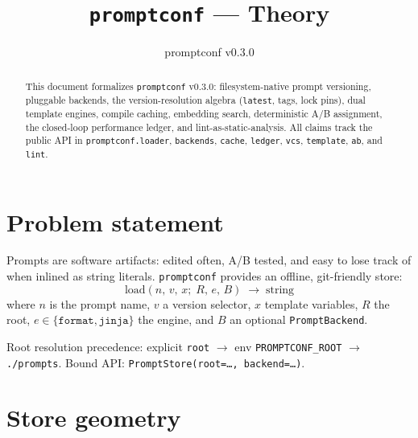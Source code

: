 \documentclass[11pt,a4paper]{article}
\newcommand{\pc}{\texttt{promptconf}}
\newcommand{\code}[1]{\texttt{#1}}
\begin{document}
\title{\pc{} --- Theory}
\author{promptconf v0.3.0}
\date{}
\maketitle

\begin{abstract}
This document formalizes \pc{} v0.3.0: filesystem-native prompt versioning,
pluggable backends, the version-resolution algebra (\code{latest}, tags, lock
pins), dual template engines, compile caching, embedding search, deterministic
A/B assignment, the closed-loop performance ledger, and lint-as-static-analysis.
All claims track the public API in \code{promptconf.loader}, \code{backends},
\code{cache}, \code{ledger}, \code{vcs}, \code{template}, \code{ab}, and
\code{lint}.
\end{abstract}

\tableofcontents
\newpage

\section{Problem statement}

Prompts are software artifacts: edited often, A/B tested, and easy to lose
track of when inlined as string literals. \pc{} provides an offline,
git-friendly store:
\begin{equation}
  \mathrm{load}(n,\, v,\, x;\; R,\, e,\, B) \;\longrightarrow\; \text{string}
\end{equation}
where $n$ is the prompt name, $v$ a version selector, $x$ template variables,
$R$ the root, $e \in \{\texttt{format},\texttt{jinja}\}$ the engine, and $B$ an
optional \code{PromptBackend}.

Root resolution precedence: explicit \code{root} $\rightarrow$ env
\code{PROMPTCONF\_ROOT} $\rightarrow$ \code{./prompts}. Bound API:
\code{PromptStore(root=\ldots, backend=\ldots)}.

\section{Store geometry}
\label{sec:store}
\end{document}
